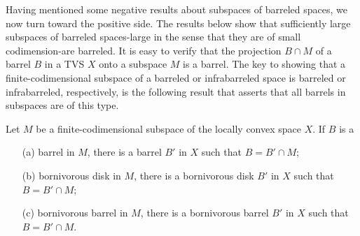 Having mentioned some negative results about subspaces of barreled spaces, we now turn toward the positive side. The results below show that sufficiently large subspaces of barreled spaces-large in the sense that they are of small codimension-are barreled. It is easy to verify that the projection $B\cap M$ of a barrel $B$ in a TVS $X$ onto a subspace $M$ is a barrel. The key to showing that a finite-codimensional subspace of a barreled or infrabarreled space is barreled or infrabarreled, respectively, is the following result that asserts that all barrels in subspaces are of this type.
\begin{proposition}\label{LCS barrel in subspace finite-codim}
Let $M$ be a finite-codimensional subspace of the locally convex space $X$. If $B$ is a
\begin{itemize}
\item[(a)] barrel in $M$, there is a barrel $B'$ in $X$ such that $B=B'\cap M$;
\item[(b)] bornivorous disk in $M$, there is a bornivorous disk $B'$ in $X$ such that $B=B'\cap M$;
\item[(c)] bornivorous barrel in $M$, there is a bornivorous barrel $B'$ in $X$ such that $B=B'\cap M$. 
\end{itemize}
\end{proposition}
